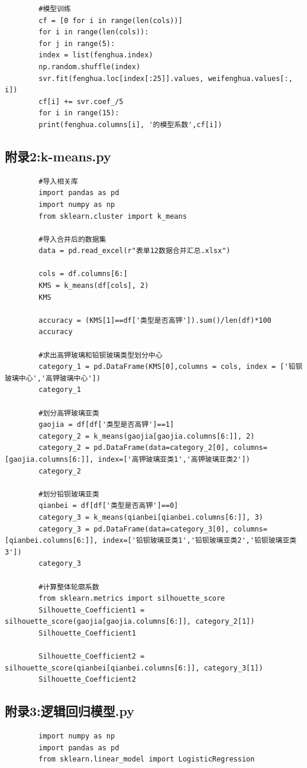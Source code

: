 \documentclass[withoutpreface,bwprint]{cumcmthesis}%
\begin{document}
\begin{appendices}
\begin{lstlisting}
		#模型训练
		cf = [0 for i in range(len(cols))]
		for i in range(len(cols)):
		for j in range(5):
		index = list(fenghua.index)
		np.random.shuffle(index)
		svr.fit(fenghua.loc[index[:25]].values, weifenghua.values[:, i])
		cf[i] += svr.coef_/5
		for i in range(15):
		print(fenghua.columns[i], '的模型系数',cf[i])
	\end{lstlisting}
	
	\subsection{附录2:k-means.py}
	\begin{lstlisting}
		#导入相关库
		import pandas as pd
		import numpy as np
		from sklearn.cluster import k_means
		
		#导入合并后的数据集
		data = pd.read_excel(r"表单12数据合并汇总.xlsx")
		
		cols = df.columns[6:]
		KMS = k_means(df[cols], 2)
		KMS
		
		accuracy = (KMS[1]==df['类型是否高钾']).sum()/len(df)*100
		accuracy
		
		#求出高钾玻璃和铅钡玻璃类型划分中心
		category_1 = pd.DataFrame(KMS[0],columns = cols, index = ['铅钡玻璃中心','高钾玻璃中心'])
		category_1
		
		#划分高钾玻璃亚类
		gaojia = df[df['类型是否高钾']==1]
		category_2 = k_means(gaojia[gaojia.columns[6:]], 2)
		category_2 = pd.DataFrame(data=category_2[0], columns=[gaojia.columns[6:]], index=['高钾玻璃亚类1','高钾玻璃亚类2'])
		category_2
		
		#划分铅钡玻璃亚类
		qianbei = df[df['类型是否高钾']==0]
		category_3 = k_means(qianbei[qianbei.columns[6:]], 3)
		category_3 = pd.DataFrame(data=category_3[0], columns=[qianbei.columns[6:]], index=['铅钡玻璃亚类1','铅钡玻璃亚类2','铅钡玻璃亚类3'])
		category_3
		
		#计算整体轮廓系数
		from sklearn.metrics import silhouette_score
		Silhouette_Coefficient1 = silhouette_score(gaojia[gaojia.columns[6:]], category_2[1])
		Silhouette_Coefficient1
		
		Silhouette_Coefficient2 = silhouette_score(qianbei[qianbei.columns[6:]], category_3[1])
		Silhouette_Coefficient2
	\end{lstlisting}

	\subsection{附录3:逻辑回归模型.py}
	\begin{lstlisting}
		import numpy as np
		import pandas as pd
		from sklearn.linear_model import LogisticRegression 
		

\end{lstlisting}
\end{appendices}
\end{document}

